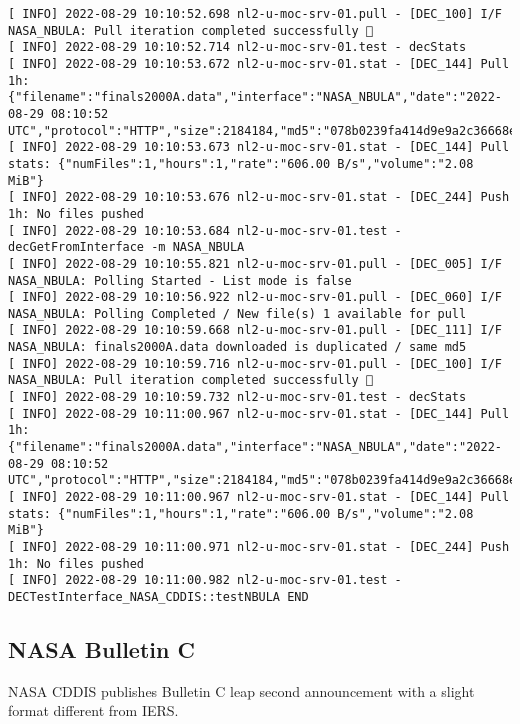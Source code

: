 \documentclass[dec_sum_main.tex]{subfiles}
\begin{document}
\begin{Verbatim}[fontsize=\tiny]
[ INFO] 2022-08-29 10:10:52.698 nl2-u-moc-srv-01.pull - [DEC_100] I/F NASA_NBULA: Pull iteration completed successfully 🕺
[ INFO] 2022-08-29 10:10:52.714 nl2-u-moc-srv-01.test - decStats
[ INFO] 2022-08-29 10:10:53.672 nl2-u-moc-srv-01.stat - [DEC_144] Pull 1h: {"filename":"finals2000A.data","interface":"NASA_NBULA","date":"2022-08-29 08:10:52 UTC","protocol":"HTTP","size":2184184,"md5":"078b0239fa414d9e9a2c36668edbbccb"}
[ INFO] 2022-08-29 10:10:53.673 nl2-u-moc-srv-01.stat - [DEC_144] Pull stats: {"numFiles":1,"hours":1,"rate":"606.00 B/s","volume":"2.08 MiB"}
[ INFO] 2022-08-29 10:10:53.676 nl2-u-moc-srv-01.stat - [DEC_244] Push 1h: No files pushed
[ INFO] 2022-08-29 10:10:53.684 nl2-u-moc-srv-01.test - decGetFromInterface -m NASA_NBULA
[ INFO] 2022-08-29 10:10:55.821 nl2-u-moc-srv-01.pull - [DEC_005] I/F NASA_NBULA: Polling Started - List mode is false
[ INFO] 2022-08-29 10:10:56.922 nl2-u-moc-srv-01.pull - [DEC_060] I/F NASA_NBULA: Polling Completed / New file(s) 1 available for pull
[ INFO] 2022-08-29 10:10:59.668 nl2-u-moc-srv-01.pull - [DEC_111] I/F NASA_NBULA: finals2000A.data downloaded is duplicated / same md5
[ INFO] 2022-08-29 10:10:59.716 nl2-u-moc-srv-01.pull - [DEC_100] I/F NASA_NBULA: Pull iteration completed successfully 🕺
[ INFO] 2022-08-29 10:10:59.732 nl2-u-moc-srv-01.test - decStats
[ INFO] 2022-08-29 10:11:00.967 nl2-u-moc-srv-01.stat - [DEC_144] Pull 1h: {"filename":"finals2000A.data","interface":"NASA_NBULA","date":"2022-08-29 08:10:52 UTC","protocol":"HTTP","size":2184184,"md5":"078b0239fa414d9e9a2c36668edbbccb"}
[ INFO] 2022-08-29 10:11:00.967 nl2-u-moc-srv-01.stat - [DEC_144] Pull stats: {"numFiles":1,"hours":1,"rate":"606.00 B/s","volume":"2.08 MiB"}
[ INFO] 2022-08-29 10:11:00.971 nl2-u-moc-srv-01.stat - [DEC_244] Push 1h: No files pushed
[ INFO] 2022-08-29 10:11:00.982 nl2-u-moc-srv-01.test - DECTestInterface_NASA_CDDIS::testNBULA END
\end{Verbatim}

\subsection{NASA Bulletin C}
NASA CDDIS publishes Bulletin C leap second announcement with a slight format different from IERS.\newline

 \newline
\end{document}
